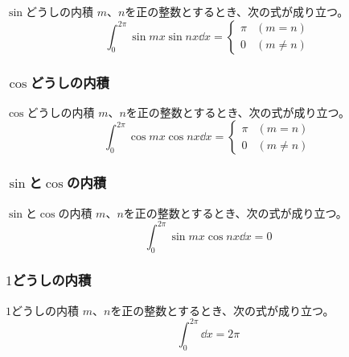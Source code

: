 \documentclass[../imaging-math]{subfiles}
\begin{document}
\begin{theorem}{$\sin$どうしの内積}
  $m$、$n$を正の整数とするとき、次の式が成り立つ。
  \LARGE
  \begin{equation}
    \int_0^{2\pi} \sin mx \sin nx \dd{x} = \left\{ \begin{array}{ll}
      \pi & (m = n)    \\
      0   & (m \neq n)
    \end{array} \right.
  \end{equation}
\end{theorem}

\subsubsection{$\cos$どうしの内積}

\begin{theorem}{$\cos$どうしの内積}
  $m$、$n$を正の整数とするとき、次の式が成り立つ。
  \LARGE
  \begin{equation}
    \int_0^{2\pi} \cos mx \cos nx \dd{x} = \left\{ \begin{array}{ll}
      \pi & (m = n)    \\
      0   & (m \neq n)
    \end{array} \right.
  \end{equation}
\end{theorem}

\subsubsection{$\sin$と$\cos$の内積}

\begin{theorem}{$\sin$と$\cos$の内積}
  $m$、$n$を正の整数とするとき、次の式が成り立つ。
  \LARGE
  \begin{equation}
    \int_0^{2\pi} \sin mx \cos nx \dd{x} = 0
  \end{equation}
\end{theorem}

\subsubsection{$1$どうしの内積}

\begin{theorem}{$1$どうしの内積}
  $m$、$n$を正の整数とするとき、次の式が成り立つ。
  \LARGE
  \begin{equation}
    \int_0^{2\pi} \dd{x} = 2\pi
  \end{equation}
\end{theorem}
\end{document}
